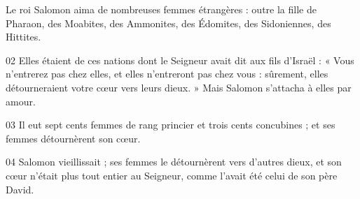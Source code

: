 Le roi Salomon aima de nombreuses femmes étrangères : outre la fille de Pharaon, des Moabites, des Ammonites, des Édomites, des Sidoniennes, des Hittites.

02 Elles étaient de ces nations dont le Seigneur avait dit aux fils d’Israël : « Vous n’entrerez pas chez elles, et elles n’entreront pas chez vous : sûrement, elles détourneraient votre cœur vers leurs dieux. » Mais Salomon s’attacha à elles par amour.

03 Il eut sept cents femmes de rang princier et trois cents concubines ; et ses femmes détournèrent son cœur.

04 Salomon vieillissait ; ses femmes le détournèrent vers d’autres dieux, et son cœur n’était plus tout entier au Seigneur, comme l’avait été celui de son père David.
